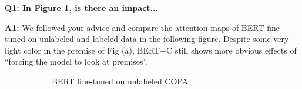 \documentclass[letterpaper]{article}
\newcommand{\figref}[1]{Figure \ref{#1}}
\begin{document}
\noindent
\textbf{Q1: In Figure 1, is there an impact...}

\noindent
\textbf{A1:} We followed your advice and compare the attention maps of BERT 
fine-tuned on unlabeled and labeled data in the following figure. 
Despite some very light color in the premise of Fig (a), BERT+C still
shows more obvious effects of ``forcing the model to look at premises''. 

\begin{figure}[th]
\centering
\begin{subfigure}[b]{0.20\textwidth}
\centering
{}
\caption{BERT fine-tuned on unlabeled COPA}
\label{fig:mlm}
\end{subfigure}
\hfill
\begin{subfigure}[b]{0.20\textwidth}
\centering

\end{subfigure}
\end{figure}
\end{document}
